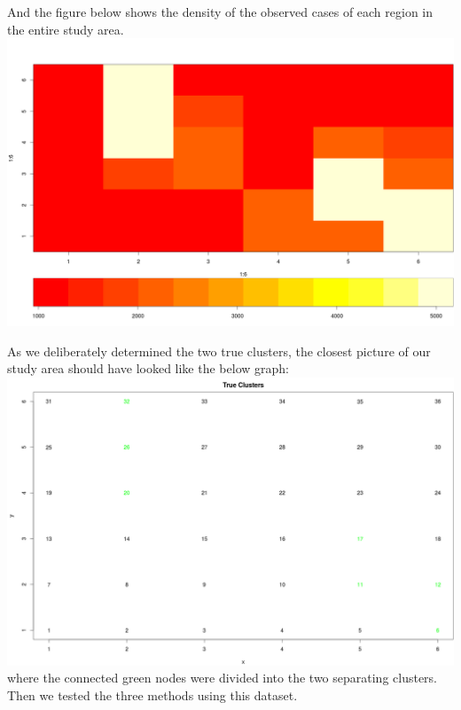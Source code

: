 \documentclass[12pt]{article}
\begin{document}
	And the figure below shows the density of the observed cases of each region in the entire study area.\\
	\includegraphics[scale=0.2]{density_cases}
	
	As we deliberately determined the two true clusters, the closest picture of our study area should have looked like the below graph: \\
	
	\includegraphics[scale=0.25]{true_clusters}\\ where the connected green nodes were divided into the two separating clusters. \\
	
	Then we tested the three methods using this dataset. \\
	
\end{document}
